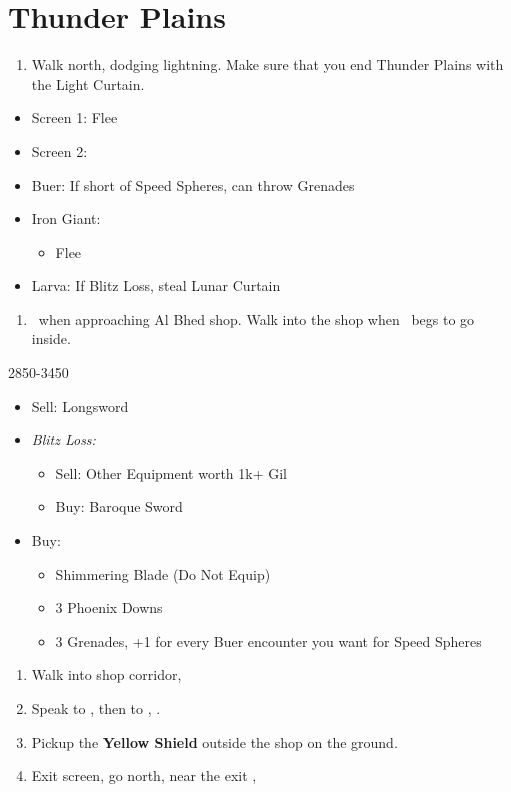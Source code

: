 \chapter{Thunder Plains}

\begin{enumerate}
	\item Walk north, dodging lightning. Make sure that you end Thunder Plains with the Light Curtain.
\end{enumerate}
\begin{encounters}
\begin{itemize}
	\item Screen 1: Flee
	\item Screen 2:
	\item Buer: If short of Speed Spheres, can throw Grenades
	\item Iron Giant:
	\begin{itemize}
		\rikkuf Steal Light Curtain
		\item Flee
	\end{itemize}
	\item Larva: If Blitz Loss, steal Lunar Curtain
\end{itemize}
\end{encounters}
\begin{enumerate}[resume]
	\item \sd\ when approaching Al Bhed shop. Walk into the shop when \rikku\ begs to go inside.
\end{enumerate}
\begin{shop}{2850-3450}
\begin{itemize}
	\item Sell: Longsword
	\item \textit{Blitz Loss:}
	\begin{itemize}
		\item Sell: Other Equipment worth 1k+ Gil
		\item Buy: Baroque Sword
	\end{itemize}
	\item Buy:
	\begin{itemize}
		\item Shimmering Blade (Do Not Equip)
		\item 3 Phoenix Downs
		\item 3 Grenades, +1 for every Buer encounter you want for Speed Spheres
	\end{itemize}
\end{itemize}
\end{shop}
\begin{enumerate}[resume]
	\item Walk into shop corridor, \cs[2:00]
	\item Speak to \auron, then to \rikku, \sd.
	\item Pickup the \textbf{Yellow Shield} outside the shop on the ground.
	\item Exit screen, go north, near the exit \sd, \cs[3:10]
\end{enumerate}